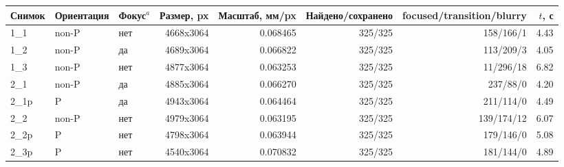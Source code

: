 \begin{tabular}{@{}lllrrrrr@{}}
\toprule
Снимок & Ориентация & Фокус$^{a}$ & Размер, px & Масштаб, мм/px &
Найдено/сохранено & focused/transition/blurry & $t$, с \\
\midrule
1\_1 & non-P & нет & 4668x3064 & \num{0.068465} & 325/325 & 158/166/1 & \num{4.43} \\
1\_2 & non-P & да & 4689x3064 & \num{0.066822} & 325/325 & 113/209/3 & \num{4.05} \\
1\_3 & non-P & нет & 4877x3064 & \num{0.063253} & 325/325 & 11/296/18 & \num{6.82} \\
2\_1 & non-P & да & 4885x3064 & \num{0.066270} & 325/325 & 237/88/0 & \num{4.20} \\
2\_1p & P & да & 4943x3064 & \num{0.064464} & 325/325 & 211/114/0 & \num{4.49} \\
2\_2 & non-P & нет & 4979x3064 & \num{0.063195} & 325/325 & 139/174/12 & \num{6.07} \\
2\_2p & P & нет & 4798x3064 & \num{0.063944} & 325/325 & 179/146/0 & \num{5.08} \\
2\_3p & P & нет & 4540x3064 & \num{0.070832} & 325/325 & 181/144/0 & \num{4.89} \\
\bottomrule
\end{tabular}

